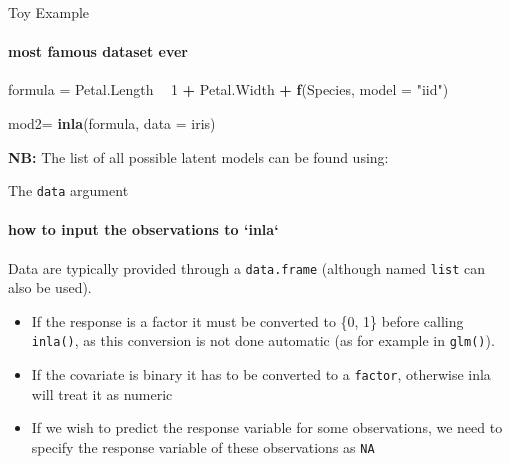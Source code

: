 \documentclass[9pt,ignorenonframetext,]{beamer}
\newenvironment{Shaded}{\begin{snugshade}}{\end{snugshade}}
\newcommand{\DataTypeTok}[1]{\textcolor[rgb]{0.13,0.29,0.53}{#1}}
\newcommand{\DecValTok}[1]{\textcolor[rgb]{0.00,0.00,0.81}{#1}}
\newcommand{\KeywordTok}[1]{\textcolor[rgb]{0.13,0.29,0.53}{\textbf{#1}}}
\newcommand{\NormalTok}[1]{#1}
\newcommand{\OperatorTok}[1]{\textcolor[rgb]{0.81,0.36,0.00}{\textbf{#1}}}
\newcommand{\StringTok}[1]{\textcolor[rgb]{0.31,0.60,0.02}{#1}}
\begin{document}
\begin{frame}[fragile]{Toy Example}
\protect\hypertarget{toy-example-1}{}

\framesubtitle{most famous dataset ever}

\begin{Shaded}
\begin{Highlighting}[]
\NormalTok{formula =}\StringTok{ }\NormalTok{Petal.Length }\OperatorTok{~}\StringTok{ }\DecValTok{1} \OperatorTok{+}\StringTok{ }\NormalTok{Petal.Width }\OperatorTok{+}\StringTok{ }\KeywordTok{f}\NormalTok{(Species, }\DataTypeTok{model =} \StringTok{"iid"}\NormalTok{)}

\NormalTok{mod2=}\StringTok{ }\KeywordTok{inla}\NormalTok{(formula, }\DataTypeTok{data =}\NormalTok{ iris)}
\end{Highlighting}
\end{Shaded}

\vspace{0.25cm}

\textbf{NB:} The list of all possible latent models can be found using:

\begin{Shaded}
\end{Shaded}

\end{frame}

\begin{frame}[fragile]{The \texttt{data} argument}
\protect\hypertarget{the-data-argument}{}

\framesubtitle{how to input the observations to `inla`}

Data are typically provided through a \texttt{data.frame} (although
named \texttt{list} can also be used).

\vspace{0.25cm}

\begin{itemize}
\item
  If the response is a factor it must be converted to \{0, 1\} before
  calling \texttt{inla()}, as this conversion is not done automatic (as
  for example in \texttt{glm()}). \vspace{0.15cm}
\item
  If the covariate is binary it has to be converted to a
  \texttt{factor}, otherwise inla will treat it as numeric
  \vspace{0.15cm}
\item
  If we wish to predict the response variable for some observations, we
  need to specify the response variable of these observations as
  \texttt{NA}
\end{itemize}

\end{frame}
\end{document}
